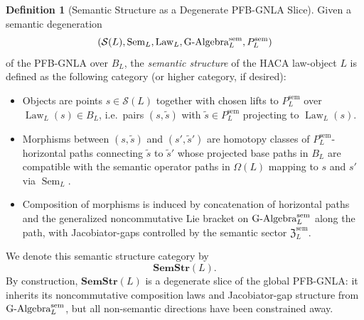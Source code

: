 \documentclass[11pt]{book}
\theoremstyle{plain}
\theoremstyle{definition}
\newtheorem{definition}[theorem]{Definition}
\theoremstyle{remark}
\begin{document}
\begin{definition}[Semantic Structure as a Degenerate PFB-GNLA Slice]
\label{def:semantic-structure-from-degeneration}
Given a semantic degeneration
\[
  (\mathcal{S}(L),\operatorname{Sem}_L,\operatorname{Law}_L,
   \text{G-Algebra}^{\mathrm{sem}}_L,P^{\mathrm{sem}}_L)
\]
of the PFB-GNLA over $B_L$, the \emph{semantic structure} of the HACA
law-object $L$ is defined as the following category (or higher
category, if desired):
\begin{itemize}
  \item Objects are points $s\in\mathcal{S}(L)$ together with chosen
        lifts to $P^{\mathrm{sem}}_L$ over $\operatorname{Law}_L(s)\in
        B_L$, i.e.\ pairs $(s,\tilde{s})$ with
        $\tilde{s}\in P^{\mathrm{sem}}_L$ projecting to
        $\operatorname{Law}_L(s)$.
  \item Morphisms between $(s,\tilde{s})$ and $(s',\tilde{s}')$ are
        homotopy classes of $P^{\mathrm{sem}}_L$-horizontal paths
        connecting $\tilde{s}$ to $\tilde{s}'$ whose projected base
        paths in $B_L$ are compatible with the semantic operator
        paths in $\Omega(L)$ mapping to $s$ and $s'$ via
        $\operatorname{Sem}_L$.
  \item Composition of morphisms is induced by concatenation of
        horizontal paths and the generalized noncommutative Lie
        bracket on $\text{G-Algebra}^{\mathrm{sem}}_L$ along the path, with
        Jacobiator-gaps controlled by the semantic sector
        $\mathfrak{Z}^{\mathrm{sem}}_L$.
\end{itemize}
We denote this semantic structure category by
\[
  \mathbf{SemStr}(L).
\]
By construction, $\mathbf{SemStr}(L)$ is a degenerate slice of the
global PFB-GNLA: it inherits its noncommutative composition laws and
Jacobiator-gap structure from $\text{G-Algebra}^{\mathrm{sem}}_L$, but all
non-semantic directions have been constrained away.

\end{definition}
\end{document}
